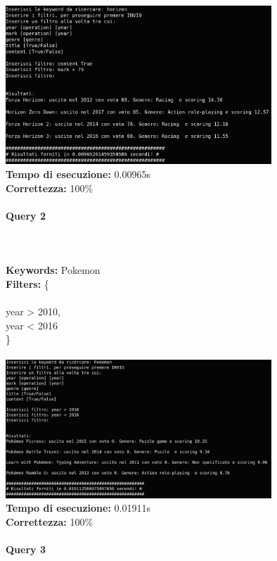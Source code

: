\documentclass[12pt]{article}
\begin{document}
\noindent \includegraphics[width=100mm]{Immagini/Image1.png} \\
\textbf{Tempo di esecuzione:} 0.00965s \\
\textbf{Correttezza:} 100\% \pagebreak

\paragraph{\LARGE{Query 2}} ~ \\ \\

\noindent \textbf{Keywords: } Pokemon \\
\textbf{Filters: } \{ \\ \\
\indent year > 2010, \\
\indent year < 2016 \\
\} \\\\

\noindent \includegraphics[width=100mm]{Immagini/Image2.png} \\
\textbf{Tempo di esecuzione:} 0.01911s \\
\textbf{Correttezza:} 100\% \pagebreak

\paragraph{\LARGE{Query 3}} ~ \\ \\
\end{document}
